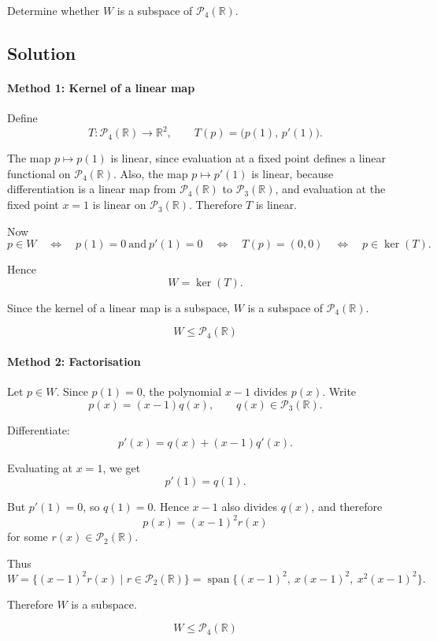 \documentclass[12pt]{article}
\newcommand{\Span}{\operatorname{span}}
\begin{document}
Determine whether \(W\) is a subspace of \(\mathcal P_4(\mathbb R)\).

\subsection{Solution}

\paragraph{Method 1: Kernel of a linear map}

Define
\[
T:\mathcal P_4(\mathbb R)\to\mathbb R^2,\qquad
T(p)=\bigl(p(1),\,p'(1)\bigr).
\]

The map \(p\mapsto p(1)\) is linear, since evaluation at a fixed point defines a linear functional on \(\mathcal P_4(\mathbb R)\). Also, the map \(p\mapsto p'(1)\) is linear, because differentiation is a linear map from \(\mathcal P_4(\mathbb R)\) to \(\mathcal P_3(\mathbb R)\), and evaluation at the fixed point \(x=1\) is linear on \(\mathcal P_3(\mathbb R)\). Therefore \(T\) is linear.

Now
\[
p\in W
\quad\Longleftrightarrow\quad
p(1)=0\ \text{and}\ p'(1)=0
\quad\Longleftrightarrow\quad
T(p)=(0,0)
\quad\Longleftrightarrow\quad
p\in\ker(T).
\]

Hence
\[
W=\ker(T).
\]

Since the kernel of a linear map is a subspace, \(W\) is a subspace of \(\mathcal P_4(\mathbb R)\).

\[
\boxed{W\le \mathcal P_4(\mathbb R)}
\]
\paragraph{Method 2: Factorisation}

Let \(p\in W\). Since \(p(1)=0\), the polynomial \(x-1\) divides \(p(x)\). Write
\[
p(x)=(x-1)q(x),
\qquad q(x)\in \mathcal P_3(\mathbb R).
\]

Differentiate:
\[
p'(x)=q(x)+(x-1)q'(x).
\]

Evaluating at \(x=1\), we get
\[
p'(1)=q(1).
\]

But \(p'(1)=0\), so \(q(1)=0\). Hence \(x-1\) also divides \(q(x)\), and therefore
\[
p(x)=(x-1)^2r(x)
\]
for some \(r(x)\in\mathcal P_2(\mathbb R)\).

Thus
\[
W=\{(x-1)^2r(x)\mid r\in\mathcal P_2(\mathbb R)\}
=\Span\{(x-1)^2,\ x(x-1)^2,\ x^2(x-1)^2\}.
\]

Therefore \(W\) is a subspace.

\[
\boxed{W\le \mathcal P_4(\mathbb R)}
\]
\end{document}
